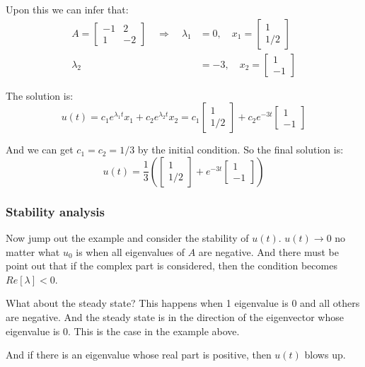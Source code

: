 \documentclass[12pt]{ctexart}
\begin{document}
Upon this we can infer that:
\begin{align*}
  A = \begin{bmatrix}
    -1 & 2 \\
    1 & -2
  \end{bmatrix}
  \quad \Rightarrow \quad
  \lambda_1 &= 0, \quad x_1 = \begin{bmatrix} 1 \\ 1/2 \end{bmatrix} \\
  \lambda_2 &= -3, \quad x_2 = \begin{bmatrix} 1 \\ -1 \end{bmatrix}
\end{align*}

The solution is:
\[
  u(t) = c_1 e^{\lambda_1 t} x_1 + c_2 e^{\lambda_2 t} x_2
  = c_1 \begin{bmatrix}
    1 \\
    1/2
  \end{bmatrix} +
  c_2 e^{-3t} \begin{bmatrix}
    1 \\
    -1
  \end{bmatrix}
\]

And we can get $c_1 = c_2 = 1/3$ by the initial condition. So the final solution is:
\[
  u(t) = \frac13 (\begin{bmatrix}
    1 \\
    1/2
  \end{bmatrix} +
  e^{-3t} \begin{bmatrix}
    1 \\
    -1
  \end{bmatrix})
\]

\subsubsection{\textbf{Stability analysis}}

Now jump out the example and consider the stability of $u(t)$. $u(t) \to 0$ no matter what
$u_0$ is when all eigenvalues of $A$ are negative. And there must be point out that if
the complex part is considered, then the condition becomes $Re[\lambda] < 0$.

What about the steady state? This happens when 1 eigenvalue is 0 and all others are
negative. And the steady state is in the direction of the eigenvector whose eigenvalue
is 0. This is the case in the example above.

And if there is an eigenvalue whose real part is positive, then $u(t)$ blows up.
\end{document}
